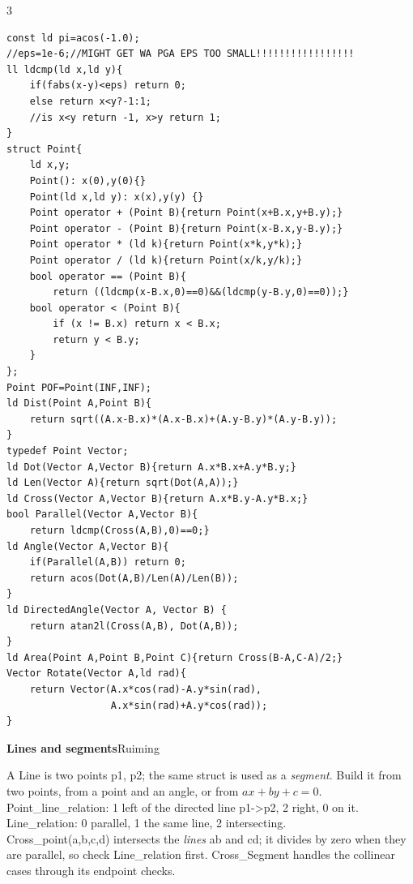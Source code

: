 \documentclass[9pt,a4paper]{extarticle}
\newcommand{\entry}[3]{%
  \addcontentsline{toc}{subsection}{#1}%
  \vspace{0.8ex}%
  \noindent\colorbox{hdbg}{\parbox{\dimexpr\columnwidth-2\fboxsep}{%
    \strut\textbf{#1}\hfill{\footnotesize\textsf{#2}}}}\par
  \vspace{0.4ex}%
  {\footnotesize #3\par}%
}
\newcommand{\code}[1]{{\ttfamily\small #1}}
\begin{document}
\begin{multicols*}{3}
\begin{lstlisting}
const ld pi=acos(-1.0);
//eps=1e-6;//MIGHT GET WA PGA EPS TOO SMALL!!!!!!!!!!!!!!!!!
ll ldcmp(ld x,ld y){
    if(fabs(x-y)<eps) return 0;
    else return x<y?-1:1;
    //is x<y return -1, x>y return 1;
}
struct Point{
    ld x,y;
    Point(): x(0),y(0){}
    Point(ld x,ld y): x(x),y(y) {}
    Point operator + (Point B){return Point(x+B.x,y+B.y);}
    Point operator - (Point B){return Point(x-B.x,y-B.y);}
    Point operator * (ld k){return Point(x*k,y*k);}
    Point operator / (ld k){return Point(x/k,y/k);}
    bool operator == (Point B){
        return ((ldcmp(x-B.x,0)==0)&&(ldcmp(y-B.y,0)==0));}
    bool operator < (Point B){
        if (x != B.x) return x < B.x;
        return y < B.y;
    }
};
Point POF=Point(INF,INF);
ld Dist(Point A,Point B){
    return sqrt((A.x-B.x)*(A.x-B.x)+(A.y-B.y)*(A.y-B.y));
}
typedef Point Vector;
ld Dot(Vector A,Vector B){return A.x*B.x+A.y*B.y;}
ld Len(Vector A){return sqrt(Dot(A,A));}
ld Cross(Vector A,Vector B){return A.x*B.y-A.y*B.x;}
bool Parallel(Vector A,Vector B){
    return ldcmp(Cross(A,B),0)==0;}
ld Angle(Vector A,Vector B){
    if(Parallel(A,B)) return 0;
    return acos(Dot(A,B)/Len(A)/Len(B));
}
ld DirectedAngle(Vector A, Vector B) {
    return atan2l(Cross(A,B), Dot(A,B));
}
ld Area(Point A,Point B,Point C){return Cross(B-A,C-A)/2;}
Vector Rotate(Vector A,ld rad){
    return Vector(A.x*cos(rad)-A.y*sin(rad),
                  A.x*sin(rad)+A.y*cos(rad));
}
\end{lstlisting}

\entry{Lines and segments}{Ruiming}{%
A \code{Line} is two points \code{p1}, \code{p2}; the same struct is used as a
\emph{segment}. Build it from two points, from a point and an angle, or from
$ax+by+c=0$.\\[0.3ex]
\code{Point\_line\_relation}: \code{1} left of the directed line \code{p1->p2},
\code{2} right, \code{0} on it. \code{Line\_relation}: \code{0} parallel, \code{1} the
same line, \code{2} intersecting.\\[0.3ex]
\code{Cross\_point(a,b,c,d)} intersects the \emph{lines} \code{ab} and \code{cd}; it
divides by zero when they are parallel, so check \code{Line\_relation} first.
\code{Cross\_Segment} handles the collinear cases through its endpoint checks.}


\end{multicols*}
\end{document}
